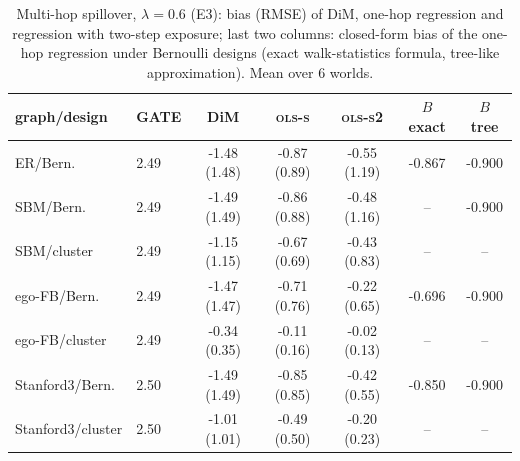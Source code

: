 \begin{table}[t]\centering\footnotesize\setlength{\tabcolsep}{3.5pt}
\caption{Multi-hop spillover, $\lambda=0.6$ (E3): bias (RMSE) of DiM, one-hop regression and regression with two-step exposure; last two columns: closed-form bias of the one-hop regression under Bernoulli designs (exact walk-statistics formula, tree-like approximation). Mean over 6 worlds.}
\label{tab:mh}
\begin{tabular}{llccccc}\toprule
graph/design & GATE & DiM & \textsc{ols-s} & \textsc{ols-s2} & $B$ exact & $B$ tree \\
\midrule
ER/Bern. & 2.49 & -1.48 (1.48) & -0.87 (0.89) & -0.55 (1.19) & -0.867 & -0.900 \\
SBM/Bern. & 2.49 & -1.49 (1.49) & -0.86 (0.88) & -0.48 (1.16) & -- & -0.900 \\
SBM/cluster & 2.49 & -1.15 (1.15) & -0.67 (0.69) & -0.43 (0.83) & -- & -- \\
ego-FB/Bern. & 2.49 & -1.47 (1.47) & -0.71 (0.76) & -0.22 (0.65) & -0.696 & -0.900 \\
ego-FB/cluster & 2.49 & -0.34 (0.35) & -0.11 (0.16) & -0.02 (0.13) & -- & -- \\
Stanford3/Bern. & 2.50 & -1.49 (1.49) & -0.85 (0.85) & -0.42 (0.55) & -0.850 & -0.900 \\
Stanford3/cluster & 2.50 & -1.01 (1.01) & -0.49 (0.50) & -0.20 (0.23) & -- & -- \\
\bottomrule\end{tabular}\end{table}
